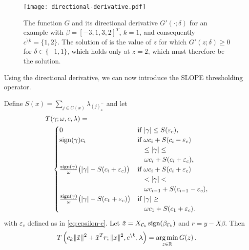 \begin{figure}[htb]
  \centering
  \texttt{[image: directional-derivative.pdf]}
  \caption{%
  The function \(G\) and its directional derivative \(G'( \cdot ; \delta)\) for
  an example with \(\beta = [-3, 1, 3, 2]^T\), \(k = 1\), and consequently
  \(c^{\setminus k} = \{1, 2\}\). The solution of  is the value of \(z\) for
  which \(G'(z; \delta) \geq 0 \) for \(\delta \in \{-1, 1\}\), which holds only
  at \(z = 2\), which must therefore be the solution.
  }
  \label{fig:directional-derivative}
\end{figure}

Using the directional derivative, we can now introduce the SLOPE thresholding operator.

\begin{theorem}
  \label{thm:thresholding-operator}
  Define \(S(x) = \sum_{j \in C(x)}\lambda_{(j)^-_{x}}\) and
  let
  \[
    \begin{multlined}
      T(\gamma; \omega, c, \lambda) = \\
      \begin{cases}
        0
         & \text{if } |\gamma| \leq S(\varepsilon_c),               \\
        \sign(\gamma)c_i
         & \text{if } \omega c_i + S(c_i - \varepsilon_c)           \\
         & \quad \leq |\gamma| \leq                                 \\
         & \quad \omega c_i + S(c_i + \varepsilon_c),               \\
        \frac{\sign(\gamma)}{\omega} \big( |\gamma| - S(c_i + \varepsilon_c) \big)
         & \text{if } \omega c_i + S(c_i + {\varepsilon_c})         \\
         & \quad < |\gamma| <                                       \\
         & \quad \omega c_{i - 1} + S(c_{i - 1} - {\varepsilon_c}), \\
        \frac{\sign(\gamma)}{\omega} \big( |\gamma| - S(c_1 + {\varepsilon_c}) \big)
         & \text{if } |\gamma| \geq                                 \\
         & \quad \omega c_1 + S(c_1 + {\varepsilon_c}).
      \end{cases}
    \end{multlined}
  \]
  with \({\varepsilon_c}\) defined as in \eqref{eq:epsilon-c}.
  Let $\tilde x = X_{\mathcal{C}_k} \operatorname{sign}(\beta_{\mathcal{C}_k})$
  and \(r = y - X\beta\).
  Then
  \begin{equation}
    \begin{multlined}
      T \left(c_k\norm{\tilde x}^2 + \tilde x^Tr; \norm{x}^2, c^{\setminus k}, \lambda \right) = \argmin_{z \in \mathbb{R}} G(z) \,.
    \end{multlined}
  \end{equation}
\end{theorem}
